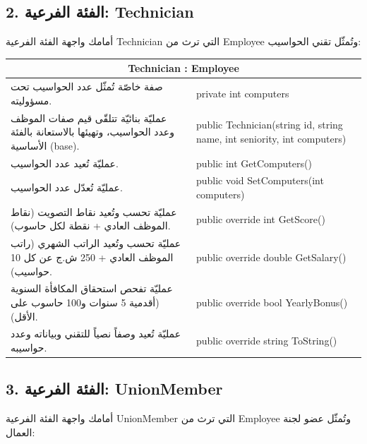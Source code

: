 \documentclass[14pt]{extarticle}
\begin{document}
\clearpage

\subsection*{2. الفئة الفرعية: \textenglish{Technician}}
أمامك واجهة الفئة الفرعية \textenglish{Technician} التي ترث من \textenglish{Employee} وتُمثّل تقني الحواسيب:

\begin{center}
\renewcommand{\arraystretch}{1.5}
{\small
\begin{tabular}{|p{}|p{}|}
\hline
\multicolumn{2}{|c|}{\textbf{\textenglish{Technician : Employee}}} \\
\hline
صفة خاصّة تُمثّل عدد الحواسيب تحت مسؤوليته. & \textenglish{private int computers} \\
\hline
عمليّة بنائيّة تتلقّى قيم صفات الموظف وعدد الحواسيب، وتهيئها بالاستعانة بالفئة الأساسية (\textenglish{base}). & \textenglish{public Technician(string id, string name, int seniority, int computers)} \\
\hline
عمليّة تُعيد عدد الحواسيب. & \textenglish{public int GetComputers()} \\
\hline
عمليّة تُعدّل عدد الحواسيب. & \textenglish{public void SetComputers(int computers)} \\
\hline
عمليّة تحسب وتُعيد نقاط التصويت (نقاط الموظف العادي + نقطة لكل حاسوب). & \textenglish{public override int GetScore()} \\
\hline
عمليّة تحسب وتُعيد الراتب الشهري (راتب الموظف العادي + 250 ش.ج عن كل 10 حواسيب). & \textenglish{public override double GetSalary()} \\
\hline
عمليّة تفحص استحقاق المكافأة السنوية (أقدمية 5 سنوات و100 حاسوب على الأقل). & \textenglish{public override bool YearlyBonus()} \\
\hline
عمليّة تُعيد وصفاً نصياً للتقني وبياناته وعدد حواسيبه. & \textenglish{public override string ToString()} \\
\hline
\end{tabular}
}
\end{center}

\clearpage

\subsection*{3. الفئة الفرعية: \textenglish{UnionMember}}
أمامك واجهة الفئة الفرعية \textenglish{UnionMember} التي ترث من \textenglish{Employee} وتُمثّل عضو لجنة العمال:
\end{document}
